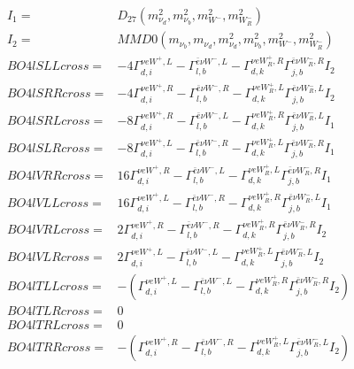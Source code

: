 \documentclass[A4,landscape]{article}
\begin{document}
\begin{align} 
I_1 = & D_{27}(m^2_{\nu_{{d}}}, m^2_{\nu_{{b}}}, m^2_{W^-}, m^2_{W_R^-}) \\ 
I_2 = & MMD0(m_{\nu_{{b}}}, m_{\nu_{{d}}}, m^2_{\nu_{{d}}}, m^2_{\nu_{{b}}}, m^2_{W^-}, m^2_{W_R^-}) \\ 
  BO4lSLLcross= & -4  \Gamma^{\nu e W^+,L}_{d, i} - \Gamma^{\bar{e}\nu W^- ,L} _{l, b} - \Gamma^{\nu e W_R^+,R} _{d, k} \Gamma^{\bar{e}\nu W_R^- ,R}_{j, b} I_2 \\ 
  BO4lSRRcross= & -4  \Gamma^{\nu e W^+,R}_{d, i} - \Gamma^{\bar{e}\nu W^- ,R} _{l, b} - \Gamma^{\nu e W_R^+,L} _{d, k} \Gamma^{\bar{e}\nu W_R^- ,L}_{j, b} I_2 \\ 
  BO4lSRLcross= & -8  \Gamma^{\nu e W^+,R}_{d, i} - \Gamma^{\bar{e}\nu W^- ,L} _{l, b} - \Gamma^{\nu e W_R^+,R} _{d, k} \Gamma^{\bar{e}\nu W_R^- ,L}_{j, b} I_1 \\ 
  BO4lSLRcross= & -8  \Gamma^{\nu e W^+,L}_{d, i} - \Gamma^{\bar{e}\nu W^- ,R} _{l, b} - \Gamma^{\nu e W_R^+,L} _{d, k} \Gamma^{\bar{e}\nu W_R^- ,R}_{j, b} I_1 \\ 
  BO4lVRRcross= & 16  \Gamma^{\nu e W^+,R}_{d, i} - \Gamma^{\bar{e}\nu W^- ,L} _{l, b} - \Gamma^{\nu e W_R^+,L} _{d, k} \Gamma^{\bar{e}\nu W_R^- ,R}_{j, b} I_1 \\ 
  BO4lVLLcross= & 16  \Gamma^{\nu e W^+,L}_{d, i} - \Gamma^{\bar{e}\nu W^- ,R} _{l, b} - \Gamma^{\nu e W_R^+,R} _{d, k} \Gamma^{\bar{e}\nu W_R^- ,L}_{j, b} I_1 \\ 
  BO4lVRLcross= & 2  \Gamma^{\nu e W^+,R}_{d, i} - \Gamma^{\bar{e}\nu W^- ,R} _{l, b} - \Gamma^{\nu e W_R^+,R} _{d, k} \Gamma^{\bar{e}\nu W_R^- ,R}_{j, b} I_2 \\ 
  BO4lVLRcross= & 2  \Gamma^{\nu e W^+,L}_{d, i} - \Gamma^{\bar{e}\nu W^- ,L} _{l, b} - \Gamma^{\nu e W_R^+,L} _{d, k} \Gamma^{\bar{e}\nu W_R^- ,L}_{j, b} I_2 \\ 
  BO4lTLLcross= & -( \Gamma^{\nu e W^+,L}_{d, i} - \Gamma^{\bar{e}\nu W^- ,L} _{l, b} - \Gamma^{\nu e W_R^+,R} _{d, k} \Gamma^{\bar{e}\nu W_R^- ,R}_{j, b} I_2) \\ 
  BO4lTLRcross= & 0 \\ 
  BO4lTRLcross= & 0 \\ 
  BO4lTRRcross= & -( \Gamma^{\nu e W^+,R}_{d, i} - \Gamma^{\bar{e}\nu W^- ,R} _{l, b} - \Gamma^{\nu e W_R^+,L} _{d, k} \Gamma^{\bar{e}\nu W_R^- ,L}_{j, b} I_2) \\ 
\end{align} 
\end{document}
